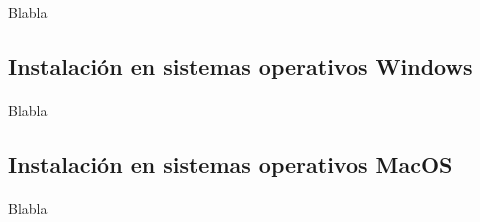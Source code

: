 \paragraph{}Blabla

\subsection{Instalación en sistemas operativos Windows}

\paragraph{}Blabla

\subsection{Instalación en sistemas operativos MacOS}

\paragraph{}Blabla

